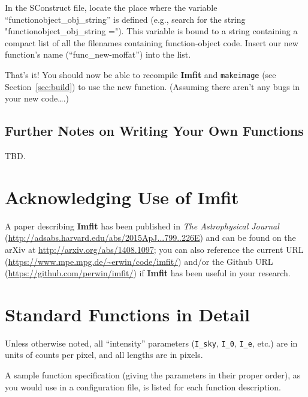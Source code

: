 \documentclass[10pt,a4paper,article]{memoir}
\newcommand{\imfit}{\textbf{Imfit}}
\newcommand{\Imfit}{\textbf{Imfit}}
\newcommand{\makeimage}{\texttt{makeimage}}
\begin{document}
In the SConstruct file, locate the place where the variable
``functionobject\_obj\_string'' is defined (e.g., search for the string
"functionobject\_obj\_string ="). This variable is bound to a string containing a
compact list of all the filenames containing function-object code. Insert our
new function's name (``func\_new-moffat'') into the list.

\bigskip

That's it! You should now be able to recompile \imfit{} and \makeimage{} 
(see Section~\ref{sec:build}) to use
the new function. (Assuming there aren't any bugs in your new code\ldots.)



\section{Further Notes on Writing Your Own Functions}

TBD.

%
%



\newpage

\chapter{Acknowledging Use of \Imfit}

A paper describing \imfit{} \citep{erwin15} has been published in
\textit{The Astrophysical Journal}
(\url{http://adsabs.harvard.edu/abs/2015ApJ...799..226E}) and can be
found on the arXiv at \url{http://arxiv.org/abs/1408.1097}; you can also
reference the current URL
(\url{https://www.mpe.mpg.de/~erwin/code/imfit/}) and/or the Github URL
(\url{https://github.com/perwin/imfit/}) if \imfit{} has been useful in
your research.


\newpage

\appendix
\chapter{Standard Functions in Detail}\label{app:functions}

Unless otherwise noted, all ``intensity'' parameters (\texttt{I\_sky},
\texttt{I\_0}, \texttt{I\_e}, etc.) are in units of counts per pixel, and all
lengths are in pixels.

A sample function specification (giving the parameters in their proper order),
as you would use in a configuration file, is listed for each function
description.
\end{document}
